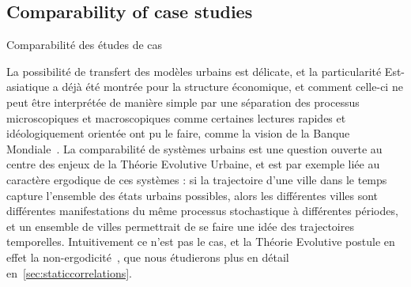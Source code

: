 \subsection{Comparability of case studies}{Comparabilité des études de cas}


La possibilité de transfert des modèles urbains est délicate, et la particularité Est-asiatique a déjà été montrée pour la structure économique, et comment celle-ci ne peut être interprétée de manière simple par une séparation des processus microscopiques et macroscopiques comme certaines lectures rapides et idéologiquement orientée ont pu le faire, comme la vision de la Banque Mondiale~\cite{amsden1994isn}. La comparabilité de systèmes urbains est une question ouverte au centre des enjeux de la Théorie Evolutive Urbaine, et est par exemple liée au caractère ergodique de ces systèmes : si la trajectoire d'une ville dans le temps capture l'ensemble des états urbains possibles, alors les différentes villes sont différentes manifestations du même processus stochastique à différentes périodes, et un ensemble de villes permettrait de se faire une idée des trajectoires temporelles. Intuitivement ce n'est pas le cas, et la Théorie Evolutive postule en effet la non-ergodicité~\cite{pumain2012urban}, que nous étudierons plus en détail en~\ref{sec:staticcorrelations}.







\stars




